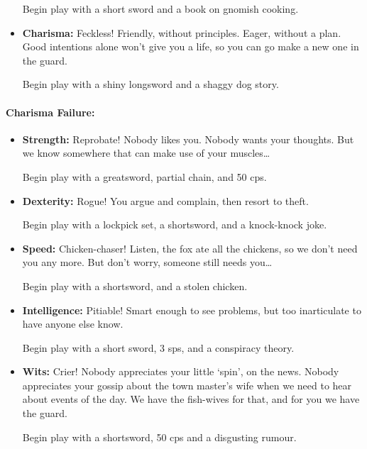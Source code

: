 \begin{multicols}{2}
\begin{itemize}
  Begin play with a short sword and a book on gnomish cooking.
  \item
  \textbf{Charisma:}
  Feckless!
  Friendly, without principles.
  Eager, without a plan.
  Good intentions alone won't give you a life, so you can go make a new one in the \gls{guard}.

  Begin play with a shiny longsword and a shaggy dog story.
\end{itemize}

\paragraph{Charisma Failure:}

\begin{itemize}

  \item
  \textbf{Strength:}
  Reprobate!
  Nobody likes you.
  Nobody wants your thoughts.
  But we know somewhere that can make use of your muscles\ldots

  Begin play with a greatsword, partial chain, and 50 \glspl{cp}.
  \item
  \textbf{Dexterity:}
  Rogue!
  You argue and complain, then resort to theft.

  Begin play with a lockpick set, a shortsword, and a knock-knock joke.
  \item
  \textbf{Speed:}
  Chicken-chaser!
  Listen, the fox ate all the chickens, so we don't need you any more.
  But don't worry, someone still needs you\ldots

  Begin play with a shortsword, and a stolen chicken.
  \item
  \textbf{Intelligence:}
  Pitiable!
  Smart enough to see problems, but too inarticulate to have anyone else know.

  Begin play with a short sword, 3 \glspl{sp}, and a conspiracy theory.
  \item
  \textbf{Wits:}
  Crier!
  Nobody appreciates your little `spin', on the news.
  Nobody appreciates your gossip about the town master's wife when we need to hear about events of the day.
  We have the fish-wives for that, and for you we have the \gls{guard}.

  Begin play with a shortsword, 50 \glspl{cp} and a disgusting rumour.

\end{itemize}

\end{multicols}
\setcounter{str}{1}
\setcounter{dex}{0}
\setcounter{spd}{0}
\setcounter{int}{0}
\setcounter{wts}{-1}
\setcounter{cha}{1}

